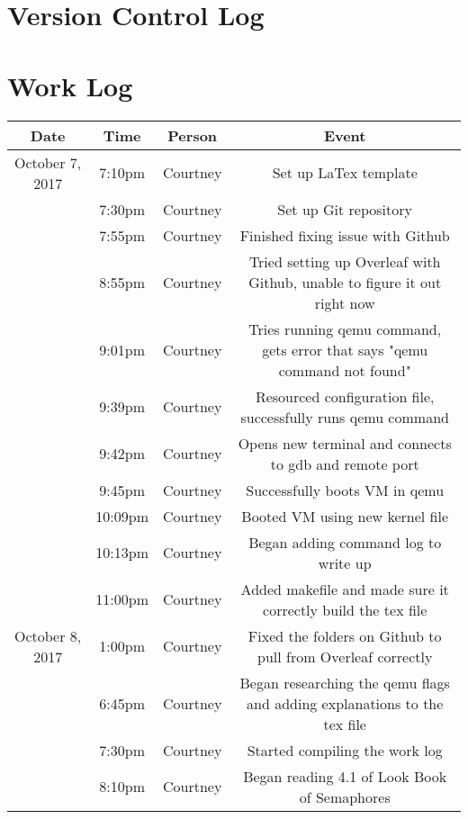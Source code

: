 \documentclass[letterpaper,10pt,draftclsnofoot,onecolumn,titlepage]{IEEEtran}
\begin{document}
\section{Version Control Log}

\section{Work Log}
\begin{center}
\begin{tabular}{ c c c c }
 Date  & Time & Person & Event \\ \hline
 October 7, 2017 & 7:10pm & Courtney & Set up LaTex template \\  
 				 & 7:30pm & Courtney & Set up Git repository \\
                 & 7:55pm & Courtney & Finished fixing issue with Github \\
                 & 8:55pm & Courtney & Tried setting up Overleaf with Github, unable to figure it out right now \\
                 & 9:01pm & Courtney & Tries running qemu command, gets error that says "qemu command not found" \\
                 & 9:39pm & Courtney & Resourced configuration file, successfully runs qemu command \\
                 & 9:42pm & Courtney & Opens new terminal and connects to gdb and remote port \\
                 & 9:45pm & Courtney & Successfully boots VM in qemu \\
                 & 10:09pm & Courtney & Booted VM using new kernel file \\
                 & 10:13pm & Courtney & Began adding command log to write up\\
                 & 11:00pm & Courtney & Added makefile and made sure it correctly build the tex file \\ \hline
 October 8, 2017 & 1:00pm & Courtney & Fixed the folders on Github to pull from Overleaf correctly \\
 				 & 6:45pm & Courtney & Began researching the qemu flags and adding explanations to the tex file \\
                 & 7:30pm & Courtney & Started compiling the work log \\
                 & 8:10pm & Courtney & Began reading 4.1 of Look Book of Semaphores \\
                 
                 
\end{tabular}
\end{center}

%


	
\end{document}

